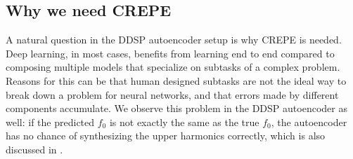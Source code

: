 

\begin{theappendices}
    \chapter{Why we need CREPE}
A natural question in the DDSP autoencoder setup is why CREPE is needed.
Deep learning, in most cases, benefits from learning end to end compared to composing multiple models that specialize on subtasks of a complex problem.
Reasons for this can be that human designed subtasks are not the ideal way to break down a problem for neural networks, and that errors made by different components accumulate. \newline
We observe this problem in the DDSP autoencoder as well: if the predicted $f_0$ is not exactly the same as the true $f_0$, the autoencoder has no chance of synthesizing the upper harmonics correctly, which is also discussed in . \newline


\end{theappendices}
